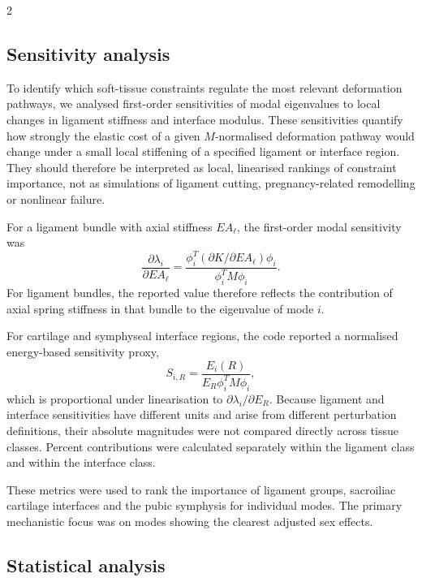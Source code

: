 \documentclass[openacc]{rsproca_new}
\begin{document}
\begin{multicols}{2}
\subsection{Sensitivity analysis}

To identify which soft-tissue constraints regulate the most relevant deformation pathways, we analysed first-order sensitivities of modal eigenvalues to local changes in ligament stiffness and interface modulus. These sensitivities quantify how strongly the elastic cost of a given $M$-normalised deformation pathway would change under a small local stiffening of a specified ligament or interface region. They should therefore be interpreted as local, linearised rankings of constraint importance, not as simulations of ligament cutting, pregnancy-related remodelling or nonlinear failure.

For a ligament bundle with axial stiffness $EA_{\ell}$, the first-order modal sensitivity was
\[
\frac{\partial \lambda_i}{\partial EA_{\ell}} =
\frac{\phi_i^{T}(\partial K/\partial EA_{\ell})\phi_i}
{\phi_i^{T}M\phi_i}.
\]
For ligament bundles, the reported value therefore reflects the contribution of axial spring stiffness in that bundle to the eigenvalue of mode $i$.

For cartilage and symphyseal interface regions, the code reported a normalised energy-based sensitivity proxy,
\[
S_{i,R} =
\frac{E_i(R)}
{E_R \phi_i^{T}M\phi_i},
\]
which is proportional under linearisation to $\partial \lambda_i/\partial E_R$. Because ligament and interface sensitivities have different units and arise from different perturbation definitions, their absolute magnitudes were not compared directly across tissue classes. Percent contributions were calculated separately within the ligament class and within the interface class.

These metrics were used to rank the importance of ligament groups, sacroiliac cartilage interfaces and the pubic symphysis for individual modes. The primary mechanistic focus was on modes showing the clearest adjusted sex effects.

\subsection{Statistical analysis}



\end{multicols}
\end{document}
